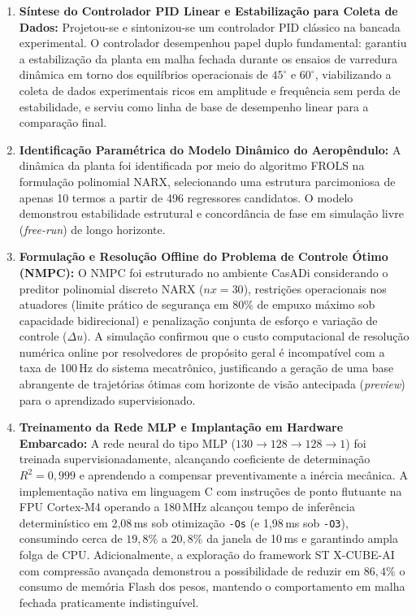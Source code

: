 \begin{enumerate}
    \item \textbf{Síntese do Controlador PID Linear e Estabilização para Coleta de Dados:} Projetou-se e sintonizou-se um controlador PID clássico na bancada experimental. O controlador desempenhou papel duplo fundamental: garantiu a estabilização da planta em malha fechada durante os ensaios de varredura dinâmica em torno dos equilíbrios operacionais de $45^\circ$ e $60^\circ$, viabilizando a coleta de dados experimentais ricos em amplitude e frequência sem perda de estabilidade, e serviu como linha de base de desempenho linear para a comparação final.
    
    \item \textbf{Identificação Paramétrica do Modelo Dinâmico do Aeropêndulo:} A dinâmica da planta foi identificada por meio do algoritmo FROLS na formulação polinomial NARX, selecionando uma estrutura parcimoniosa de apenas 10 termos a partir de 496 regressores candidatos. O modelo demonstrou estabilidade estrutural e concordância de fase em simulação livre (\textit{free-run}) de longo horizonte. 
    
    \item \textbf{Formulação e Resolução Offline do Problema de Controle Ótimo (NMPC):} O NMPC foi estruturado no ambiente CasADi considerando o preditor polinomial discreto NARX ($nx = 30$), restrições operacionais nos atuadores (limite prático de segurança em $80\%$ de empuxo máximo sob capacidade bidirecional) e penalização conjunta de esforço e variação de controle ($\Delta u$). A simulação confirmou que o custo computacional de resolução numérica online por resolvedores de propósito geral é incompatível com a taxa de 100\,Hz do sistema mecatrônico, justificando a geração de uma base abrangente de trajetórias ótimas com horizonte de visão antecipada (\textit{preview}) para o aprendizado supervisionado.
    
    \item \textbf{Treinamento da Rede MLP e Implantação em Hardware Embarcado:} A rede neural do tipo MLP ($130 \to 128 \to 128 \to 1$) foi treinada supervisionadamente, alcançando coeficiente de determinação $R^2 = 0{,}999$ e aprendendo a compensar preventivamente a inércia mecânica. A implementação nativa em linguagem C com instruções de ponto flutuante na FPU Cortex-M4 operando a 180\,MHz alcançou tempo de inferência determinístico em 2,08\,ms sob otimização \texttt{-Os} (e 1,98\,ms sob \texttt{-O3}), consumindo cerca de $19{,}8\%$ a $20{,}8\%$ da janela de 10\,ms e garantindo ampla folga de CPU. Adicionalmente, a exploração do framework ST X-CUBE-AI com compressão avançada demonstrou a possibilidade de reduzir em $86{,}4\%$ o consumo de memória Flash dos pesos, mantendo o comportamento em malha fechada praticamente indistinguível.
    

\end{enumerate}
